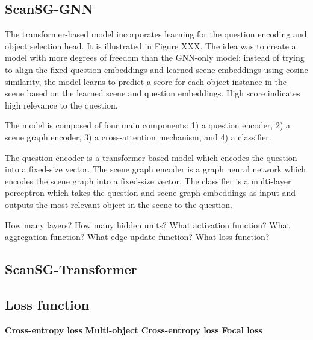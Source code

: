 \subsection{ScanSG-GNN}

The transformer-based model incorporates learning for the question encoding and object selection head. It is illustrated in Figure XXX. The idea was to create a model with more degrees of freedom than the GNN-only model: instead of trying to align the fixed question embeddings and learned scene embeddings using cosine similarity, the model learns to predict a  score for each object instance in the scene based on the learned scene and question embeddings. High score indicates high relevance to the question.

The model is composed of four main components: 1) a question encoder, 2) a scene graph encoder, 3) a cross-attention mechanism, and 4) a classifier.

The question encoder is a transformer-based model which encodes the question into a fixed-size vector. The scene graph encoder is a graph neural network which encodes the scene graph into a fixed-size vector. The classifier is a multi-layer perceptron which takes the question and scene graph embeddings as input and outputs the most relevant object in the scene to the question.

How many layers? How many hidden units? What activation function? What aggregation function? What edge update function? What loss function?

\subsection{ScanSG-Transformer}

\subsection{Loss function}

\textbf{Cross-entropy loss}
\textbf{Multi-object Cross-entropy loss}
\textbf{Focal loss}
